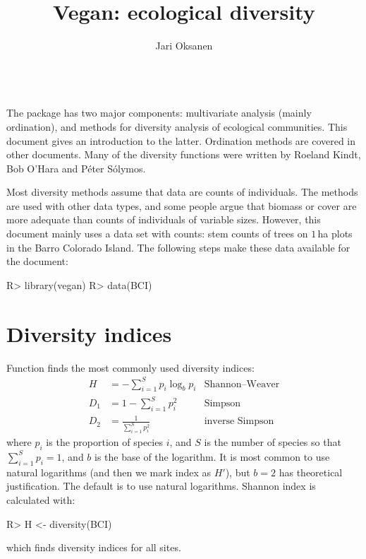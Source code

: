 \documentclass[article,nojss]{jss}
\title{Vegan: ecological diversity} \author{Jari Oksanen}
\begin{document}


\tableofcontents

 ~\\[2ex]
\noindent The  package has two major components:
multivariate analysis (mainly ordination), and methods for diversity
analysis of ecological communities.  This document gives an
introduction to the latter.  Ordination methods are covered in other
documents.  Many of the diversity functions were written by Roeland
Kindt, Bob O'Hara and P{\'e}ter S{\'o}lymos.

Most diversity methods assume that data are counts of individuals.
The methods are used with other data types, and some people argue that
biomass or cover are more adequate than counts of individuals of
variable sizes.  However, this document mainly uses a data set with
counts: stem counts of trees on $1$\,ha plots in the Barro Colorado
Island.  The following steps make these data available for the
document:
\begin{Schunk}
\begin{Sinput}
R> library(vegan)
R> data(BCI)
\end{Sinput}
\end{Schunk}

\section{Diversity indices}

Function  finds the most commonly used diversity
indices:
\begin{align}
H &= - \sum_{i=1}^S p_i \log_b  p_i & \text{Shannon--Weaver}\\
D_1 &= 1 - \sum_{i=1}^S p_i^2  &\text{Simpson}\\
D_2 &= \frac{1}{\sum_{i=1}^S p_i^2}  &\text{inverse Simpson}
\end{align}
where $p_i$ is the proportion of species $i$, and $S$ is the number of
species so that $\sum_{i=1}^S p_i = 1$, and $b$ is the base of the
logarithm.  It is most common to use natural logarithms (and then we
mark index as $H'$), but $b=2$ has
theoretical justification. The default is to use natural logarithms.
Shannon index is calculated with:
\begin{Schunk}
\begin{Sinput}
R> H <- diversity(BCI)
\end{Sinput}
\end{Schunk}
which finds diversity indices for all sites.
\end{document}
